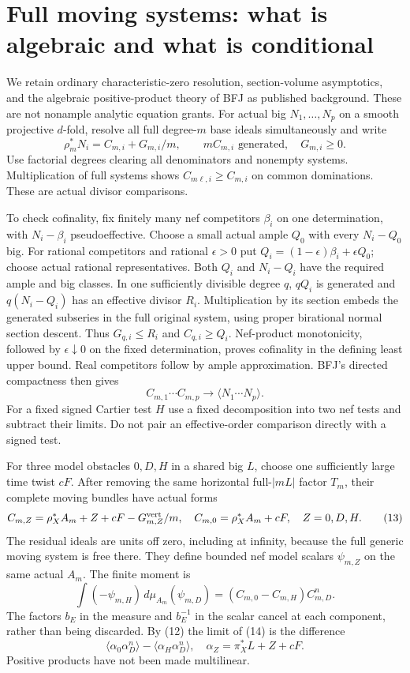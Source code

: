 \documentclass[10pt]{article}
\begin{document}
\section{Full moving systems: what is algebraic and what is conditional}
We retain ordinary characteristic-zero resolution, section-volume
asymptotics, and the algebraic positive-product theory of BFJ as
published background. These are not nonample analytic equation grants.
For actual big $N_1,\ldots,N_p$ on a smooth projective $d$-fold,
resolve all full degree-$m$ base ideals simultaneously and write
\[
 \rho_m^*N_i=C_{m,i}+G_{m,i}/m,\qquad
 mC_{m,i}\text{ generated},\quad G_{m,i}\geq0.
\]
Use factorial degrees clearing all denominators and nonempty systems.
Multiplication of full systems shows $C_{m\ell,i}\geq C_{m,i}$
on common dominations. These are actual divisor comparisons.

To check cofinality, fix finitely many nef competitors $\beta_i$
on one determination, with $N_i-\beta_i$ pseudoeffective.
Choose a small actual ample $Q_0$ with every $N_i-Q_0$ big.
For rational competitors and rational $\epsilon>0$ put
$Q_i=(1-\epsilon)\beta_i+\epsilon Q_0$; choose actual rational
representatives. Both $Q_i$ and $N_i-Q_i$ have the required
ample and big classes. In one sufficiently divisible degree $q$,
$qQ_i$ is generated and $q(N_i-Q_i)$ has an effective divisor $R_i$.
Multiplication by its section embeds the generated subseries in the
full original system, using proper birational normal section descent.
Thus $G_{q,i}\leq R_i$ and $C_{q,i}\geq Q_i$.
Nef-product monotonicity, followed by $\epsilon\downarrow0$ on the
fixed determination, proves cofinality in the defining least upper
bound. Real competitors follow by ample approximation.
BFJ's directed compactness then gives
\[
 C_{m,1}\cdots C_{m,p}\longrightarrow
                       \langle N_1\cdots N_p\rangle.         \tag{12}
\]
For a fixed signed Cartier test $H$ use a fixed decomposition into
two nef tests and subtract their limits. Do not pair an effective-order
comparison directly with a signed test.

For three model obstacles $0,D,H$ in a shared big $L$, choose one
sufficiently large time twist $cF$. After removing the same
horizontal full-$|mL|$ factor $T_m$, their complete moving bundles have
actual forms
\[
 C_{m,Z}=\rho_X^*A_m+Z+cF-G_{m,Z}^{\rm vert}/m,\quad
 C_{m,0}=\rho_X^*A_m+cF,\quad Z=0,D,H.                       \tag{13}
\]
The residual ideals are units off zero, including at infinity, because
the full generic moving system is free there. They define bounded
nef model scalars $\psi_{m,Z}$ on the same actual $A_m$.
The finite moment is
\[
 \int(-\psi_{m,H})\,d\mu_{A_m}(\psi_{m,D})
             =(C_{m,0}-C_{m,H})C_{m,D}^n.                   \tag{14}
\]
The factors $b_E$ in the measure and $b_E^{-1}$ in the scalar
cancel at each component, rather than being discarded.
By (12) the limit of (14) is the difference
\[
 \langle\alpha_0\alpha_D^n\rangle-
 \langle\alpha_H\alpha_D^n\rangle,\quad
 \alpha_Z=\pi_X^*L+Z+cF.                                   \tag{15}
\]
Positive products have not been made multilinear.
\end{document}
